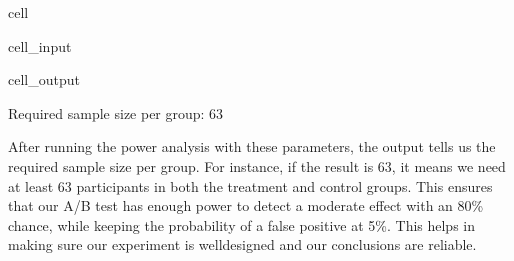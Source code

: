 \documentclass[letterpaper,10pt,english]{jupyterBook}
\begin{document}
\begin{sphinxuseclass}{cell}\begin{sphinxVerbatimInput}

\begin{sphinxuseclass}{cell_input}
\begin{sphinxVerbatim}[commandchars=\\\{\}]
   

  
  
  

  
     
\end{sphinxVerbatim}

\end{sphinxuseclass}\end{sphinxVerbatimInput}
\begin{sphinxVerbatimOutput}

\begin{sphinxuseclass}{cell_output}
\begin{sphinxVerbatim}[commandchars=\\\{\}]
Required sample size per group: 63
\end{sphinxVerbatim}

\end{sphinxuseclass}\end{sphinxVerbatimOutput}

\end{sphinxuseclass}
\sphinxAtStartPar
After running the power analysis with these parameters, the output tells us the required sample size per group. For instance, if the result is 63, it means we need at least 63 participants in both the treatment and control groups. This ensures that our A/B test has enough power to detect a moderate effect with an 80\% chance, while keeping the probability of a false positive at 5\%. This helps in making sure our experiment is well\sphinxhyphen{}designed and our conclusions are reliable.
\end{document}
